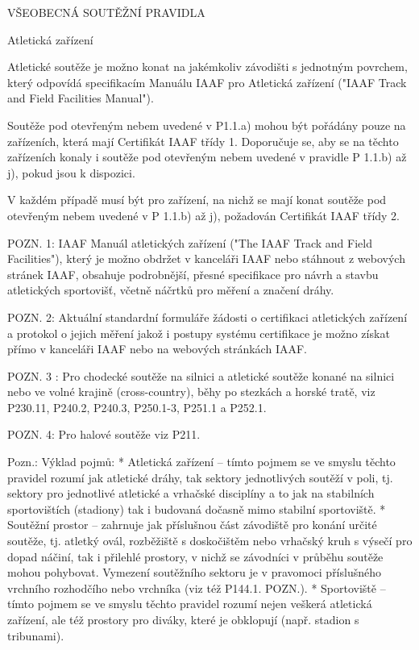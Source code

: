 \sec VŠEOBECNÁ SOUTĚŽNÍ PRAVIDLA

\secc Atletická zařízení

Atletické soutěže je možno konat na jakémkoliv závodišti s jednotným povrchem, který odpovídá specifikacím Manuálu IAAF pro Atletická zařízení ("IAAF Track and Field Facilities Manual").

Soutěže pod otevřeným nebem uvedené v P1.1.a) mohou být pořádány pouze na zařízeních, která mají Certifikát IAAF třídy 1.
Doporučuje se, aby se na těchto zařízeních konaly i soutěže pod otevřeným nebem uvedené v pravidle P 1.1.b) až j), pokud jsou k dispozici.

V každém případě musí být pro zařízení, na nichž se mají konat soutěže pod otevřeným nebem uvedené v P 1.1.b) až j), požadován Certifikát IAAF třídy 2.

POZN. 1: IAAF Manuál atletických zařízení ("The IAAF Track and Field Facilities"), který je možno obdržet v kanceláři IAAF nebo stáhnout z webových stránek IAAF, obsahuje podrobnější, přesné specifikace pro návrh a stavbu atletických sportovišť, včetně náčrtků pro měření a značení dráhy.

POZN. 2: Aktuální standardní formuláře žádosti o certifikaci atletických zařízení a protokol o jejich měření jakož i postupy systému certifikace je možno získat přímo v kanceláři IAAF nebo na webových stránkách IAAF.

POZN. 3 : Pro chodecké soutěže na silnici a atletické soutěže konané na silnici nebo ve volné krajině (cross-country), běhy po stezkách a horské tratě, viz P230.11, P240.2, P240.3, P250.1-3, P251.1 a P252.1.

POZN. 4: Pro halové soutěže viz P211.

Pozn.: Výklad pojmů:
\begitems
* Atletická zařízení -- tímto pojmem se ve smyslu těchto pravidel rozumí jak atletické dráhy, tak sektory jednotlivých soutěží v poli, tj. sektory pro jednotlivé atletické a vrhačské disciplíny a to jak na stabilních sportovištích (stadiony) tak i budovaná dočasně mimo stabilní sportoviště.
* Soutěžní prostor -- zahrnuje jak příslušnou část závodiště pro konání určité soutěže, tj. atletký ovál, rozběžiště s doskočištěm nebo vrhačský kruh s výsečí pro dopad náčiní, tak i přilehlé prostory, v nichž se závodníci v průběhu soutěže mohou pohybovat. Vymezení soutěžního sektoru je v pravomoci příslušného vrchního rozhodčího nebo vrchníka (viz též P144.1. POZN.).
* Sportoviště -- tímto pojmem se ve smyslu těchto pravidel rozumí nejen veškerá atletická zařízení, ale též prostory pro diváky, které je obklopují (např. stadion s tribunami).
\enditems

